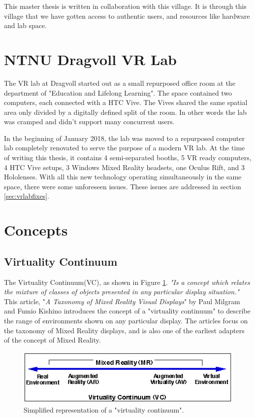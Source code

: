             This master thesis is written in collaboration with this village. It is through this village that we have gotten access to authentic users, and resources like hardware and lab space.
        
    \section{NTNU Dragvoll VR Lab}
        The VR lab at Dragvoll started out as a small repurposed office room at the department of "Education and Lifelong Learning". The space contained two computers, each connected with a HTC Vive. The Vives shared the same spatial area only divided by a digitally defined split of the room. In other words the lab was cramped and didn't support many concurrent users.
        
        In the beginning of January 2018, the lab was moved to a repurposed computer lab completely renovated to serve the purpose of a modern VR lab. At the time of writing this thesis, it contains 4 semi-separated booths, 5 VR ready computers, 4 HTC Vive setups, 3 Windows Mixed Reality headsets, one Oculus Rift, and 3 Hololenses. With all this new technology operating simultaneously in the same space, there were some unforeseen issues. These issues are addressed in section \ref{sec:vrlabfixes}.
        
    \section{Concepts}
    
        \subsection{Virtuality Continuum}
            The Virtuality Continuum(VC), as shown in Figure \ref{fig:virtualcontinuum}. \emph{"Is a concept which relates the mixture of classes of objects presented in any particular display situation."}\cite{Milgram1994} This article, "\emph{A Taxonomy of Mixed Reality Visual Displays}" by Paul Milgram and Fumio Kishino\cite{Milgram1994} introduces the concept of a "virtuality continuum" to describe the range of environments shown on any particular display. The articles focus on the taxonomy of Mixed Reality displays, and is also one of the earliest adapters of the concept of Mixed Reality.
            \begin{figure}[!ht]
                \centering
                \includegraphics[scale=1]{figures/virtualcontinuum.png}
                \caption{Simplified representation of a "virtuality continuum".\cite{Milgram1994}}
                \label{fig:virtualcontinuum}
            \end{figure}
        
